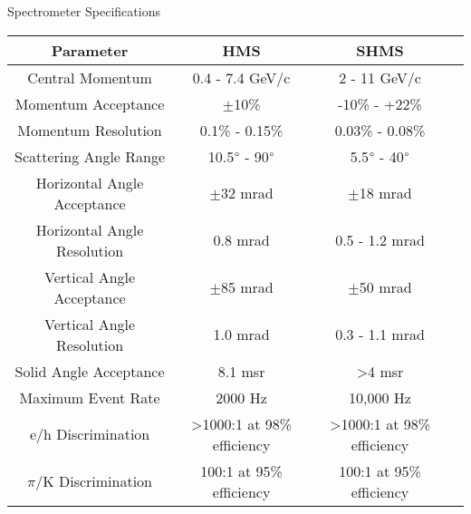 \begin{Mtable}{Spectrometer Specifications}
  \centering
  \begin{tabular}{|c|c|c|c|}
    \hline
    \textbf{Parameter} & \textbf{HMS} & \textbf{SHMS}\\
    \hline
    Central Momentum & 0.4 - 7.4 GeV/c & 2 - 11 GeV/c \\
    Momentum Acceptance & $\pm$10\% & -10\% - +22\% \\
    Momentum Resolution & 0.1\% - 0.15\% & 0.03\% - 0.08\% \\
    Scattering Angle Range & 10.5$\degree$ - 90$\degree$ & 5.5$\degree$ - 40$\degree$ \\
    \hline
    Horizontal Angle Acceptance & $\pm$32 mrad & $\pm$18 mrad \\
    Horizontal Angle Resolution & 0.8 mrad & 0.5 - 1.2 mrad \\
    Vertical Angle Acceptance & $\pm$85 mrad & $\pm$50 mrad \\
    Vertical Angle Resolution & 1.0 mrad & 0.3 - 1.1 mrad \\
    Solid Angle Acceptance & 8.1 msr & >4 msr \\
    \hline
    Maximum Event Rate & 2000 Hz & 10,000 Hz \\
    e/h Discrimination & >1000:1 at 98\% efficiency & >1000:1 at 98\% efficiency \\
    $\pi$/K Discrimination & 100:1 at 95\% efficiency & 100:1 at 95\% efficiency \\
    \hline
  \end{tabular}
  \caption{Break down of the HMS and SHMS specifications and capablilities.}  
  \label{tab:2-4_spectrometer}
\end{Mtable}

